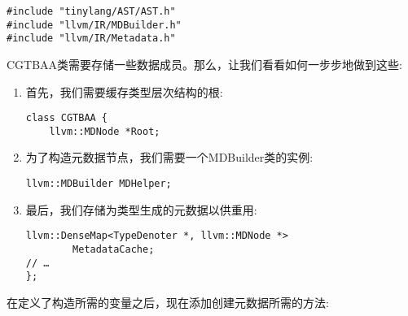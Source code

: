 \begin{lstlisting}[caption={}]
#include "tinylang/AST/AST.h"
#include "llvm/IR/MDBuilder.h"
#include "llvm/IR/Metadata.h"
\end{lstlisting}

CGTBAA类需要存储一些数据成员。那么，让我们看看如何一步步地做到这些:\par

\begin{enumerate}
\item 首先，我们需要缓存类型层次结构的根:
\begin{lstlisting}[caption={}]
class CGTBAA {
	llvm::MDNode *Root;
\end{lstlisting}

\item 为了构造元数据节点，我们需要一个MDBuilder类的实例:
\begin{lstlisting}[caption={}]
 	llvm::MDBuilder MDHelper;
\end{lstlisting}

\item 最后，我们存储为类型生成的元数据以供重用:
\begin{lstlisting}[caption={}]
	llvm::DenseMap<TypeDenoter *, llvm::MDNode *> 
		MetadataCache;
// …
};
\end{lstlisting}
\end{enumerate}

在定义了构造所需的变量之后，现在添加创建元数据所需的方法:\par


